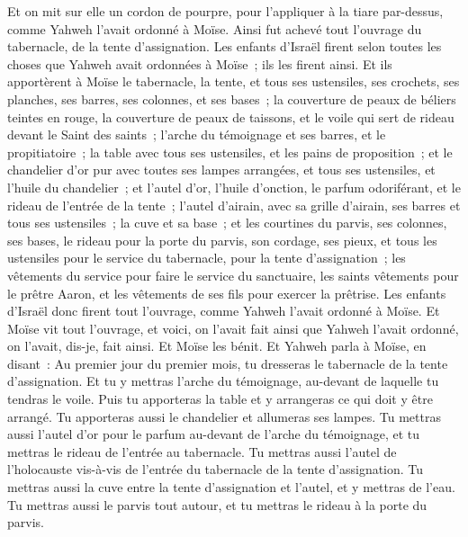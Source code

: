 \begin{multicols}{2}
Et on mit sur elle un cordon de pourpre, pour l'appliquer à la tiare par-dessus, comme Yahweh l'avait ordonné à Moïse.
Ainsi fut achevé tout l'ouvrage du tabernacle, de la tente d'assignation. Les enfants d'Israël firent selon toutes les choses que Yahweh avait ordonnées à Moïse~; ils les firent ainsi.
Et ils apportèrent à Moïse le tabernacle, la tente, et tous ses ustensiles, ses crochets, ses planches, ses barres, ses colonnes, et ses bases~;
la couverture de peaux de béliers teintes en rouge, la couverture de peaux de taissons, et le voile qui sert de rideau devant le Saint des saints~;
l'arche du témoignage et ses barres, et le propitiatoire~;
la table avec tous ses ustensiles, et les pains de proposition~;
et le chandelier d'or pur avec toutes ses lampes arrangées, et tous ses ustensiles, et l'huile du chandelier~;
et l'autel d'or, l'huile d'onction, le parfum odoriférant, et le rideau de l'entrée de la tente~;
l'autel d'airain, avec sa grille d'airain, ses barres et tous ses ustensiles~; la cuve et sa base~;
et les courtines du parvis, ses colonnes, ses bases, le rideau pour la porte du parvis, son cordage, ses pieux, et tous les ustensiles pour le service du tabernacle, pour la tente d'assignation~;
les vêtements du service pour faire le service du sanctuaire, les saints vêtements pour le prêtre Aaron, et les vêtements de ses fils pour exercer la prêtrise.
Les enfants d'Israël donc firent tout l'ouvrage, comme Yahweh l'avait ordonné à Moïse.
Et Moïse vit tout l'ouvrage, et voici, on l'avait fait ainsi que Yahweh l'avait ordonné, on l'avait, dis-je, fait ainsi. Et Moïse les bénit.
\VerseOne{}Et Yahweh parla à Moïse, en disant~:
Au premier jour du premier mois, tu dresseras le tabernacle de la tente d'assignation.
Et tu y mettras l'arche du témoignage, au-devant de laquelle tu tendras le voile.
Puis tu apporteras la table et y arrangeras ce qui doit y être arrangé. Tu apporteras aussi le chandelier et allumeras ses lampes.
Tu mettras aussi l'autel d'or pour le parfum au-devant de l'arche du témoignage, et tu mettras le rideau de l'entrée au tabernacle.
Tu mettras aussi l'autel de l'holocauste vis-à-vis de l'entrée du tabernacle de la tente d'assignation.
Tu mettras aussi la cuve entre la tente d'assignation et l'autel, et y mettras de l'eau.
Tu mettras aussi le parvis tout autour, et tu mettras le rideau à la porte du parvis.

\end{multicols}
